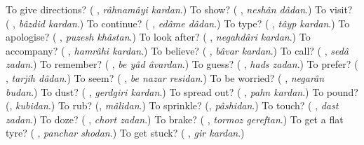 \begin{tcolorbox}[breakable,colback=teal!4,colframe=teal!35!black,title={Before you move on}]
To give directions? (\textbf{ }, \emph{râhnamâyi kardan}.) To show? (\textbf{ }, \emph{neshân dâdan}.) To visit? (\textbf{ }, \emph{bâzdid kardan}.) To continue? (\textbf{ }, \emph{edâme dâdan}.) To type? (\textbf{ }, \emph{tâyp kardan}.) To apologise? (\textbf{ }, \emph{puzesh khâstan}.) To look after? (\textbf{ }, \emph{negahdâri kardan}.) To accompany? (\textbf{ }, \emph{hamrâhi kardan}.) To believe? (\textbf{ }, \emph{bâvar kardan}.) To call? (\textbf{ }, \emph{sedâ zadan}.) To remember? (\textbf{  }, \emph{be yâd âvardan}.) To guess? (\textbf{ }, \emph{hads zadan}.) To prefer? (\textbf{ }, \emph{tarjih dâdan}.) To seem? (\textbf{  }, \emph{be nazar residan}.) To be worried? (\textbf{ }, \emph{negarân budan}.) To dust? (\textbf{ }, \emph{gerdgiri kardan}.) To spread out? (\textbf{ }, \emph{pahn kardan}.) To pound? (\textbf{}, \emph{kubidan}.) To rub? (\textbf{}, \emph{mâlidan}.) To sprinkle? (\textbf{}, \emph{pâshidan}.) To touch? (\textbf{ }, \emph{dast zadan}.) To doze? (\textbf{ }, \emph{chort zadan}.) To brake? (\textbf{ }, \emph{tormoz gereftan}.) To get a flat tyre? (\textbf{ }, \emph{panchar shodan}.) To get stuck? (\textbf{ }, \emph{gir kardan}.)
\end{tcolorbox}
